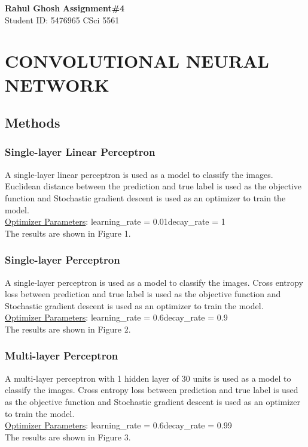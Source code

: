 \documentclass[letter, 10pt]{article}
\begin{document}
\noindent
\large \textbf{Rahul Ghosh} \hfill \textbf{Assignment\#4}\\
\normalsize Student ID: 5476965 \hfill CSci 5561\\

\section*{\centering CONVOLUTIONAL NEURAL NETWORK}

\subsection*{Methods}
\subsubsection*{Single-layer Linear Perceptron}
A single-layer linear perceptron is used as a model to classify the images. Euclidean distance between the prediction and true label is used as the objective function and Stochastic gradient descent is used as an optimizer to train the model.\\
\underline{Optimizer Parameters}: learning\_rate = 0.01\quad decay\_rate = 1\\
The results are shown in Figure 1.

\subsubsection*{Single-layer Perceptron}
A single-layer perceptron is used as a model to classify the images. Cross entropy loss between prediction and true label is used as the objective function and Stochastic gradient descent is used as an optimizer to train the model.\\
\underline{Optimizer Parameters}: learning\_rate = 0.6\quad decay\_rate = 0.9\\
The results are shown in Figure 2.

\subsubsection*{Multi-layer Perceptron}
A multi-layer perceptron with 1 hidden layer of 30 units is used as a model to classify the images. Cross entropy loss between prediction and true label is used as the objective function and Stochastic gradient descent is used as an optimizer to train the model.\\
\underline{Optimizer Parameters}: learning\_rate = 0.6\quad decay\_rate = 0.99\\
The results are shown in Figure 3.
\end{document}
